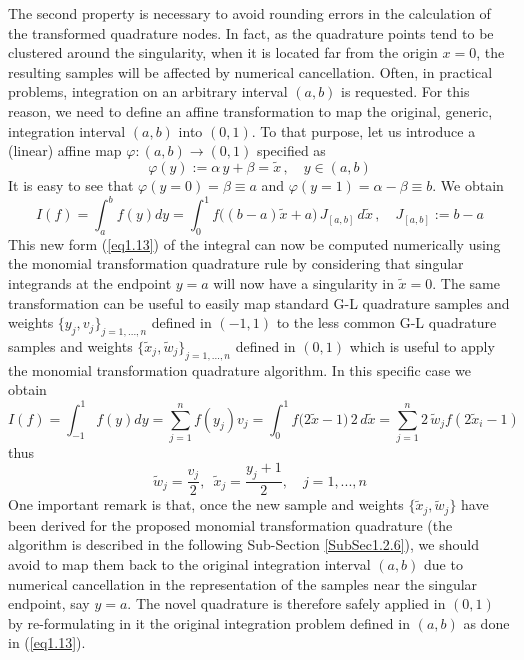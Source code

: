 \documentclass[a4paper, twosided]{book}
\begin{document}
\noindent
The second property is necessary to avoid rounding errors in the calculation of the transformed quadrature nodes. In fact, as the quadrature points tend to be clustered around the singularity, when it is located far from the origin $x=0$, the resulting samples will be affected by numerical cancellation. Often, in practical problems, integration on an arbitrary interval $(a,b)$ is requested. For this reason, we need to define an affine transformation to map the original, generic, integration interval $(a,b)$ into $(0,1)$. To that purpose, let us introduce a (linear) affine map $\varphi:(a,b)\to(0,1)$ specified as
\begin{equation}\label{eq1.12}
    \varphi(y) := \alpha\,y + \beta = \tilde{x}\,,\quad y\in(a,b)
\end{equation}
\noindent
It is easy to see that $\varphi(y=0)=\beta\equiv a$ and $\varphi(y=1)=\alpha-\beta\equiv b$. We obtain
\begin{equation}\label{eq1.13}
    I(f) = \int_a^b f(y) dy = \int_{0}^{1} f\Big(({b-a})\tilde{x}+a\Big)\,J_{[a,b]}\,d\tilde{x}\,,\quad J_{[a,b]}:=b-a
\end{equation}
\noindent
This new form (\ref{eq1.13}) of the integral can now be computed numerically using the monomial transformation quadrature rule by considering that singular integrands at the endpoint $y=a$ will now have a singularity in $\tilde{x}=0$. The same transformation can be useful to easily map standard G-L quadrature samples and weights $\{y_j, v_j\}_{j=1,...,n}$ defined in $(-1,1)$ to the less common G-L quadrature samples and weights $\{\tilde{x}_j,\tilde{w}_j\}_{j=1,...,n}$ defined in $(0,1)$ which is useful to apply the monomial transformation quadrature algorithm. In this specific case we obtain
\begin{equation}\label{eq1.14}
    I(f) = \int_{-1}^1 f(y) dy =\sum_{j=1}^n f(y_j)v_j = \int_{0}^{1} f\Big(2\tilde{x}-1\Big)\,2\, d\tilde{x}=\sum_{j=1}^n 2\,\tilde{w}_j f(2 \tilde{x}_i-1)
\end{equation}
\noindent
thus
\begin{equation}\label{eq1.15}
    \tilde{w}_j=\frac{v_j}{2}, \;\: \tilde{x}_j=\frac{y_j+1}{2}, \quad j=1,...,n
\end{equation}
\noindent
One important remark is that, once the new sample and weights $\{\tilde{x}_j,\tilde{w}_j\}$ have been derived for the proposed monomial transformation quadrature (the algorithm is described in the following Sub-Section \ref{SubSec1.2.6}), we should avoid to map them back to the original integration interval $(a,b)$ due to numerical cancellation in the representation of the samples near the singular endpoint, say $y=a$. The novel quadrature is therefore safely applied in $(0,1)$ by re-formulating in it the original integration problem defined in $(a,b)$ as done in (\ref{eq1.13}).
\end{document}
